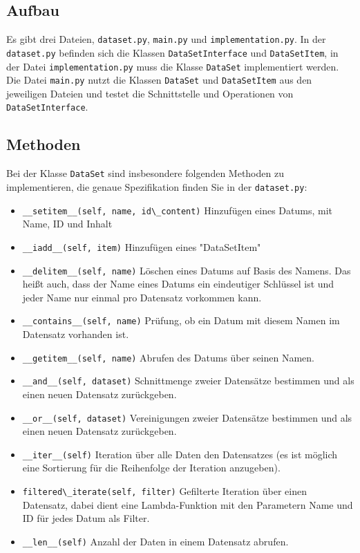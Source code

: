 \documentclass[]{article}
\begin{document}
\subsection{Aufbau}

Es gibt drei Dateien, \verb|dataset.py|, \verb|main.py| und \verb|implementation.py|.
In der \verb|dataset.py| befinden sich die Klassen \verb|DataSetInterface| und \verb|DataSetItem|,
in der Datei \verb|implementation.py| muss die Klasse \verb|DataSet| implementiert werden.
Die Datei \verb|main.py| nutzt die Klassen \verb|DataSet| und \verb|DataSetItem| aus den jeweiligen Dateien und testet die Schnittstelle und Operationen von \verb|DataSetInterface|.

\bigskip
\subsection{Methoden}

Bei der Klasse \verb|DataSet| sind insbesondere folgenden Methoden zu implementieren, die genaue Spezifikation finden Sie in der \verb|dataset.py|:

\begin{itemize}\itemsep0pt
\item \verb|__setitem__(self, name, id\_content)| Hinzufügen eines Datums, mit Name, ID und Inhalt
\item \verb|__iadd__(self, item)| Hinzufügen eines "DataSetItem"
\item \verb|__delitem__(self, name)| Löschen eines Datums auf Basis des Namens. Das heißt auch, dass der Name eines Datums ein eindeutiger Schlüssel ist und jeder Name nur einmal pro Datensatz vorkommen kann.
\item \verb|__contains__(self, name)| Prüfung, ob ein Datum mit diesem Namen im Datensatz vorhanden ist.
\item \verb|__getitem__(self, name)| Abrufen des Datums über seinen Namen.
\item \verb|__and__(self, dataset)| Schnittmenge zweier Datensätze bestimmen und als einen neuen Datensatz zurückgeben.
\item \verb|__or__(self, dataset)| Vereinigungen zweier Datensätze bestimmen und als einen neuen Datensatz zurückgeben.
\item \verb|__iter__(self)| Iteration über alle Daten den Datensatzes (es ist möglich eine Sortierung für die Reihenfolge der Iteration anzugeben).
\item \verb|filtered\_iterate(self, filter)| Gefilterte Iteration über einen Datensatz, dabei dient eine Lambda-Funktion mit den Parametern Name und ID für jedes Datum als Filter.
\item \verb|__len__(self)| Anzahl der Daten in einem Datensatz abrufen.
\end{itemize}
\end{document}
